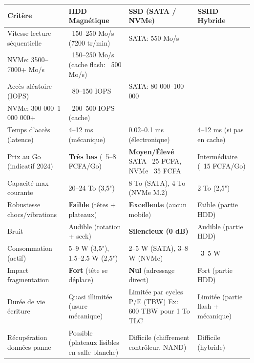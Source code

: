 \documentclass[11pt]{article}
\begin{document}
\begin{center}
\begin{tabularx}{\linewidth}{|l|X|X|X|}
\hline
\rowcolor{popblueL}
\textbf{Critère} & \textbf{HDD Magnétique} & \textbf{SSD (SATA / NVMe)} & \textbf{SSHD Hybride} \\
\hline
Vitesse lecture séquentielle & ~150--250 Mo/s (7200 tr/min) & SATA: 550 Mo/s \\ NVMe: 3500--7000+ Mo/s & ~150--250 Mo/s (cache flash: ~500 Mo/s) \\
\hline
Accès aléatoire (IOPS) & ~80--150 IOPS & SATA: 80 000--100 000 \\ NVMe: 300 000--1 000 000+ & ~200--500 IOPS (cache) \\
\hline
Temps d'accès (latence) & 4--12 ms (mécanique) & 0.02--0.1 ms (électronique) & 4--12 ms (si pas en cache) \\
\hline
Prix au Go (indicatif 2024) & \textbf{Très bas} (~5--8 FCFA/Go) & \textbf{Moyen/Élevé} SATA ~25 FCFA, NVMe ~35 FCFA & Intermédiaire (~15 FCFA/Go) \\
\hline
Capacité max courante & 20--24 To (3,5") & 8 To (SATA), 4 To (NVMe M.2) & 2 To (2,5") \\
\hline
Robustesse chocs/vibrations & \textbf{Faible} (têtes + plateaux) & \textbf{Excellente} (aucun mobile) & Faible (partie HDD) \\
\hline
Bruit & Audible (rotation + seek) & \textbf{Silencieux (0 dB)} & Audible (partie HDD) \\
\hline
Consommation (actif) & 5--9 W (3,5"), 1.5--2.5 W (2,5") & 2--5 W (SATA), 3--8 W (NVMe) & ~3--5 W \\
\hline
Impact fragmentation & \textbf{Fort} (tête se déplace) & \textbf{Nul} (adressage direct) & Fort (partie HDD) \\
\hline
Durée de vie écriture & Quasi illimitée (usure mécanique) & Limitée par cycles P/E (TBW) Ex: 600 TBW pour 1 To TLC & Limitée (partie flash + mécanique) \\
\hline
Récupération données panne & Possible (plateaux lisibles en salle blanche) & Difficile (chiffrement contrôleur, NAND) & Difficile (hybride) \\
\hline
\end{tabularx}
\end{center}
\end{document}
